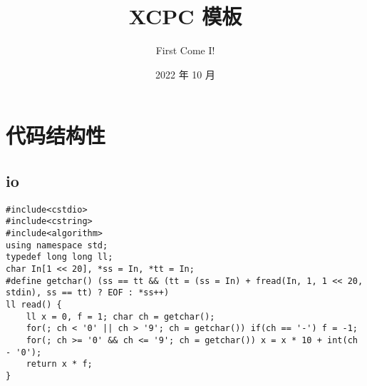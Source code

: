 \documentclass{article}
\title{\songti XCPC 模板}
\author{\kaishu First Come I!}
\date{2022 年 10 月}
\begin{document}
    \maketitle

    \tableofcontents
    
    \fangsong

    \section{代码结构性}
    \subsection{io}
\begin{lstlisting}
#include<cstdio>
#include<cstring>
#include<algorithm>
using namespace std;
typedef long long ll;
char In[1 << 20], *ss = In, *tt = In;
#define getchar() (ss == tt && (tt = (ss = In) + fread(In, 1, 1 << 20, stdin), ss == tt) ? EOF : *ss++)
ll read() {
	ll x = 0, f = 1; char ch = getchar();
	for(; ch < '0' || ch > '9'; ch = getchar()) if(ch == '-') f = -1;
	for(; ch >= '0' && ch <= '9'; ch = getchar()) x = x * 10 + int(ch - '0');
	return x * f;
}    
\end{lstlisting}
\end{document}
